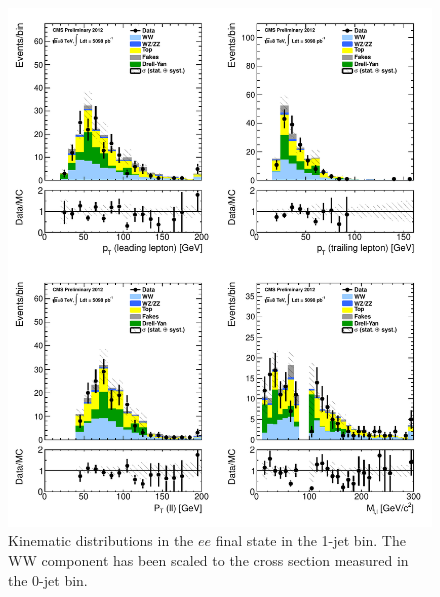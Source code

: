 \begin{figure}[!hbtp]
\centering
\includegraphics[width=1\textwidth]{figures/ww_analysis20_0_ALL_ee_1j.pdf} %
\caption{Kinematic distributions in the $ee$ final state in the 1-jet bin.
The WW component has been scaled to the cross section measured in the 0-jet bin.}
\label{fig:xs_kinematics_ee_1j}
\end{figure}
